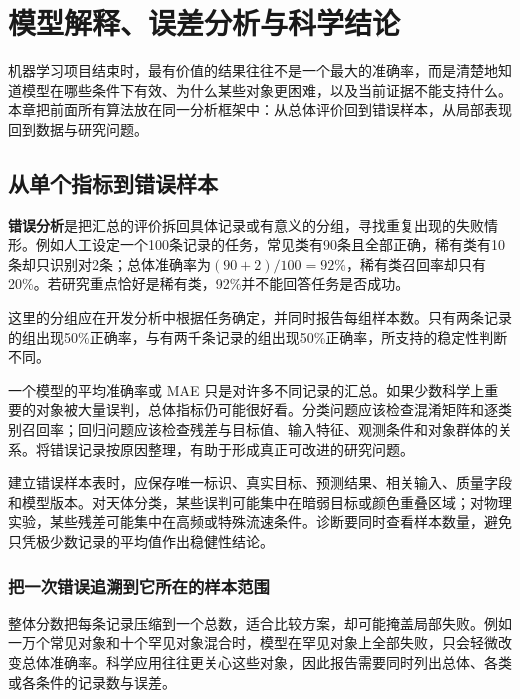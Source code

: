 \chapter{模型解释、误差分析与科学结论}

机器学习项目结束时，最有价值的结果往往不是一个最大的准确率，而是清楚地知道模型在哪些条件下有效、为什么某些对象更困难，以及当前证据不能支持什么。本章把前面所有算法放在同一分析框架中：从总体评价回到错误样本，从局部表现回到数据与研究问题。
\section{从单个指标到错误样本}

\textbf{错误分析}是把汇总的评价拆回具体记录或有意义的分组，寻找重复出现的失败情形。例如人工设定一个100条记录的任务，常见类有90条且全部正确，稀有类有10条却只识别对2条；总体准确率为$(90+2)/100=92\%$，稀有类召回率却只有20\%。若研究重点恰好是稀有类，92\%并不能回答任务是否成功。

这里的分组应在开发分析中根据任务确定，并同时报告每组样本数。只有两条记录的组出现50\%正确率，与有两千条记录的组出现50\%正确率，所支持的稳定性判断不同。

一个模型的平均准确率或 MAE 只是对许多不同记录的汇总。如果少数科学上重要的对象被大量误判，总体指标仍可能很好看。分类问题应该检查混淆矩阵和逐类别召回率；回归问题应该检查残差与目标值、输入特征、观测条件和对象群体的关系。将错误记录按原因整理，有助于形成真正可改进的研究问题。

建立错误样本表时，应保存唯一标识、真实目标、预测结果、相关输入、质量字段和模型版本。对天体分类，某些误判可能集中在暗弱目标或颜色重叠区域；对物理实验，某些残差可能集中在高频或特殊流速条件。诊断要同时查看样本数量，避免只凭极少数记录的平均值作出稳健性结论。


\subsection{把一次错误追溯到它所在的样本范围}
整体分数把每条记录压缩到一个总数，适合比较方案，却可能掩盖局部失败。例如一万个常见对象和十个罕见对象混合时，模型在罕见对象上全部失败，只会轻微改变总体准确率。科学应用往往更关心这些对象，因此报告需要同时列出总体、各类或各条件的记录数与误差。

